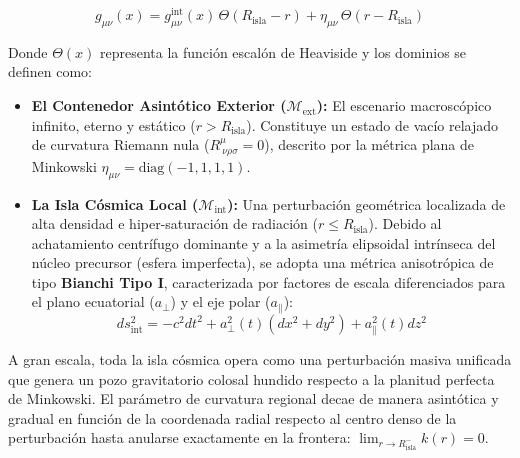 \documentclass[11pt,a4paper]{article}
\begin{document}
\begin{equation}
g_{\mu\nu}(x) = g_{\mu\nu}^{\text{int}}(x)\,\Theta(R_{\text{isla}} - r) + \eta_{\mu\nu}\,\Theta(r - R_{\text{isla}})
\end{equation}

Donde $\Theta(x)$ representa la función escalón de Heaviside y los dominios se definen como:
\begin{itemize}
    \item \textbf{El Contenedor Asintótico Exterior ($\mathcal{M}_{\text{ext}}$):} El escenario macroscópico infinito, eterno y estático ($r > R_{\text{isla}}$). Constituye un estado de vacío relajado de curvatura Riemann nula ($R^\mu_{\ \nu\rho\sigma} = 0$), descrito por la métrica plana de Minkowski $\eta_{\mu\nu} = \text{diag}(-1, 1, 1, 1)$.
    \item \textbf{La Isla Cósmica Local ($\mathcal{M}_{\text{int}}$):} Una perturbación geométrica localizada de alta densidad e hiper-saturación de radiación ($r \le R_{\text{isla}}$). Debido al achatamiento centrífugo dominante y a la asimetría elipsoidal intrínseca del núcleo precursor (esfera imperfecta), se adopta una métrica anisotrópica de tipo \textbf{Bianchi Tipo I}, caracterizada por factores de escala diferenciados para el plano ecuatorial ($a_{\perp}$) y el eje polar ($a_{\parallel}$):
    \begin{equation}
    ds^2_{\text{int}} = -c^2 dt^2 + a_{\perp}^2(t)(dx^2 + dy^2) + a_{\parallel}^2(t)dz^2
    \end{equation}
\end{itemize}

A gran escala, toda la isla cósmica opera como una perturbación masiva unificada que genera un pozo gravitatorio colosal hundido respecto a la planitud perfecta de Minkowski. El parámetro de curvatura regional decae de manera asintótica y gradual en función de la coordenada radial respecto al centro denso de la perturbación hasta anularse exactamente en la frontera: $\lim_{r \to R_{\text{isla}}^-} k(r) = 0$.
\end{document}
